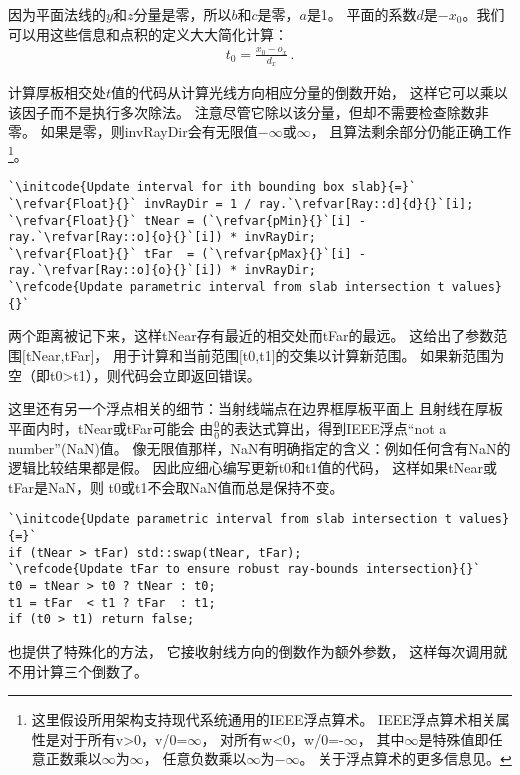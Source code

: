 因为平面法线的$y$和$z$分量是零，所以$b$和$c$是零，$a$是1。
平面的系数$d$是$-x_0$。我们可以用这些信息和点积的定义大大简化计算：
\begin{align*}
    t_0=\frac{x_0-o_x}{d_x}\, .
\end{align*}

计算厚板相交处$t$值的代码从计算光线方向相应分量的倒数开始，
这样它可以乘以该因子而不是执行多次除法。
注意尽管它除以该分量，但却不需要检查除数非零。
如果是零，则{\ttfamily invRayDir}会有无限值$-\infty$或$\infty$，
且算法剩余部分仍能正确工作
\footnote{这里假设所用架构支持现代系统通用的IEEE浮点算术。
IEEE浮点算术相关属性是对于所有{\ttfamily v>0}，{\ttfamily v/0=}$\infty$，
对所有{\ttfamily w<0}，{\ttfamily w/0=-}$\infty$，
其中$\infty$是特殊值即任意正数乘以$\infty$为$\infty$，
任意负数乘以$\infty$为$-\infty$。
关于浮点算术的更多信息见\protect{}。}。
\begin{lstlisting}
`\initcode{Update interval for ith bounding box slab}{=}`
`\refvar{Float}{}` invRayDir = 1 / ray.`\refvar[Ray::d]{d}{}`[i];
`\refvar{Float}{}` tNear = (`\refvar{pMin}{}`[i] - ray.`\refvar[Ray::o]{o}{}`[i]) * invRayDir;
`\refvar{Float}{}` tFar  = (`\refvar{pMax}{}`[i] - ray.`\refvar[Ray::o]{o}{}`[i]) * invRayDir;
`\refcode{Update parametric interval from slab intersection t values}{}`
\end{lstlisting}

两个距离被记下来，这样{\ttfamily tNear}存有最近的相交处而{\ttfamily tFar}的最远。
这给出了参数范围$[${\ttfamily tNear,tFar}$]$，
用于计算和当前范围$[${\ttfamily t0,t1}$]$的交集以计算新范围。
如果新范围为空（即{\ttfamily t0>t1}），则代码会立即返回错误。

这里还有另一个浮点相关的细节：当射线端点在边界框厚板平面上
且射线在厚板平面内时，{\ttfamily tNear}或{\ttfamily tFar}可能会
由$\frac{0}{0}$的表达式算出，得到IEEE浮点“not a number”(NaN)值。
像无限值那样，NaN有明确指定的含义：例如任何含有NaN的逻辑比较结果都是假。
因此应细心编写更新{\ttfamily t0}和{\ttfamily t1}值的代码，
这样如果{\ttfamily tNear}或{\ttfamily tFar}是NaN，则
{\ttfamily t0}或{\ttfamily t1}不会取NaN值而总是保持不变。
\begin{lstlisting}
`\initcode{Update parametric interval from slab intersection t values}{=}`
if (tNear > tFar) std::swap(tNear, tFar);
`\refcode{Update tFar to ensure robust ray-bounds intersection}{}`
t0 = tNear > t0 ? tNear : t0;
t1 = tFar  < t1 ? tFar  : t1;
if (t0 > t1) return false;
\end{lstlisting}

也提供了特殊化的方法，
它接收射线方向的倒数作为额外参数，
这样每次调用就不用计算三个倒数了。

